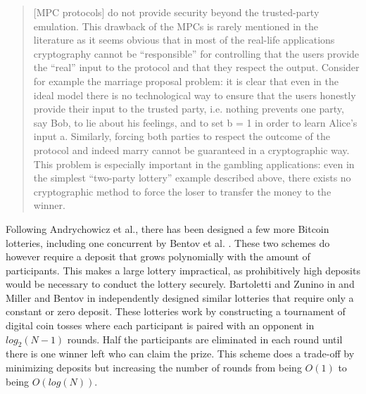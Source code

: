 \begin{quotation}
  [MPC protocols] do not provide security
  beyond the trusted-party emulation. This drawback of the
  MPCs is rarely mentioned in the literature as it seems obvious
  that in most of the real-life applications cryptography cannot
  be “responsible” for controlling that the users provide the
  “real” input to the protocol and that they respect the output.
  Consider for example the marriage proposal problem: it is clear
  that even in the ideal model there is no technological way
  to ensure that the users honestly provide their input to the
  trusted party, i.e. nothing prevents one party, say Bob, to lie
  about his feelings, and to set b = 1 in order to learn Alice’s
  input a. Similarly, forcing both parties to respect the outcome
  of the protocol and indeed marry cannot be guaranteed in a
  cryptographic way. This problem is especially important in the
  gambling applications: even in the simplest “two-party lottery”
  example described above, there exists no cryptographic method
  to force the loser to transfer the money to the winner.
\end{quotation}

Following Andrychowicz et al., there has been designed a few more Bitcoin lotteries, including one concurrent by Bentov et al. \cite{bentov_how_2014}. These two schemes do however require a deposit that grows polynomially with the amount of participants. This makes a large lottery impractical, as prohibitively high deposits would be necessary to conduct the lottery securely. Bartoletti and Zunino in \cite{bartoletti_constant-deposit_2017} and Miller and Bentov in \cite{miller_zero-collateral_2017} independently designed similar lotteries that require only a constant or zero deposit. These lotteries work by constructing a tournament of digital coin tosses where each participant is paired with an opponent in $log_2(N-1)$ rounds. Half the participants are eliminated in each round until there is one winner left who can claim the prize. This scheme does a trade-off by minimizing deposits but increasing the number of rounds from being $O(1)$ to being $O(log(N))$. 
